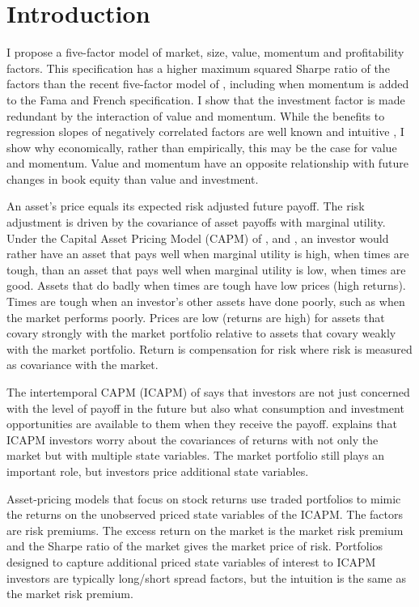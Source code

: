 
\section{Introduction}

I propose a five-factor model of market, size, value, momentum and profitability factors.
This specification has a higher maximum squared Sharpe ratio of the factors than the
recent five-factor model of \textcite{fama2015five}, including when momentum is added to
the Fama and French specification. I show that the investment factor is made redundant by
the interaction of value and momentum. While the benefits to regression slopes of
negatively correlated factors are well known and intuitive
\parencite{asness1997interaction, fama2015incremental}, I show why economically, rather
than empirically, this may be the case for value and momentum. Value and momentum have an
opposite relationship with future changes in book equity than value and investment.

An asset’s price equals its expected risk adjusted future payoff. The risk adjustment is
driven by the covariance of asset payoffs with marginal utility. Under the Capital Asset
Pricing Model (CAPM) of \textcite{sharpe1964capital}, \textcite{lintner1965valuation} and
\textcite{black1972capital}, an investor would rather have an asset that pays well when
marginal utility is high, when times are tough, than an asset that pays well when marginal
utility is low, when times are good. Assets that do badly when times are tough have low
prices (high returns). Times are tough when an investor’s other assets have done poorly,
such as when the market performs poorly. Prices are low (returns are high) for assets that
covary strongly with the market portfolio relative to assets that covary weakly with the
market portfolio. Return is compensation for risk where risk is measured as covariance
with the market.

The intertemporal CAPM (ICAPM) of \textcite{merton1973intertemporal} says that investors are
not just concerned with the level of payoff in the future but also what consumption and
investment opportunities are available to them when they receive the payoff.
\textcite{fama1996multifactor} explains that ICAPM investors worry about the covariances
of returns with not only the market but with multiple state variables. The market
portfolio still plays an important role, but investors price additional state variables.

Asset-pricing models that focus on stock returns use traded portfolios to mimic the
returns on the unobserved priced state variables of the ICAPM. The factors are risk
premiums. The excess return on the market is the market risk premium and the Sharpe ratio
of the market gives the market price of risk. Portfolios designed to capture additional
priced state variables of interest to ICAPM investors are typically long/short spread
factors, but the intuition is the same as the market risk premium.

